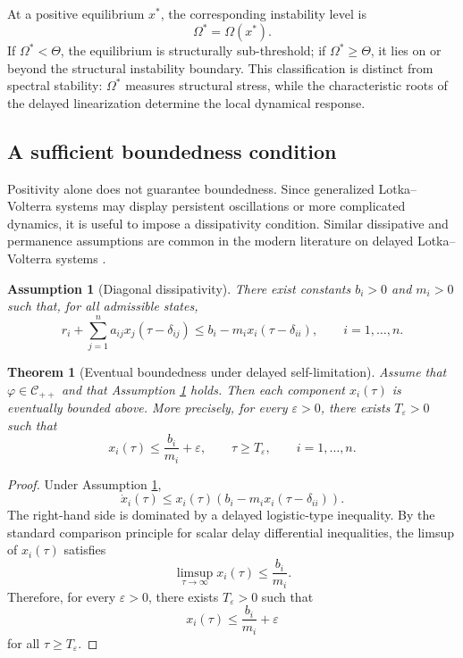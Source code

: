 \documentclass[11pt]{article}
\newtheorem{assumption}{Assumption}
\newtheorem{theorem}{Theorem}
\begin{document}
At a positive equilibrium \(x^\ast\), the corresponding instability level is
\[
\Omega^\ast=\Omega(x^\ast).
\]
If \(\Omega^\ast<\Theta\), the equilibrium is structurally sub-threshold; if \(\Omega^\ast\geq\Theta\), it lies on or beyond the structural instability boundary. This classification is distinct from spectral stability: \(\Omega^\ast\) measures structural stress, while the characteristic roots of the delayed linearization determine the local dynamical response.

\subsection{A sufficient boundedness condition}

Positivity alone does not guarantee boundedness. Since generalized
Lotka--Volterra systems may display persistent oscillations or more complicated
dynamics, it is useful to impose a dissipativity condition. Similar dissipative
and permanence assumptions are common in the modern literature on delayed
Lotka--Volterra systems \cite{JiangHalikMuhammadhaji2023NSpeciesDelays}.

\begin{assumption}[Diagonal dissipativity]
	\label{ass:dissipativity}
	There exist constants \(b_i>0\) and \(m_i>0\) such that, for all admissible
	states,
	\[
	r_i+\sum_{j=1}^{n}a_{ij}x_j(\tau-\delta_{ij})
	\leq
	b_i-m_i x_i(\tau-\delta_{ii}),
	\qquad i=1,\ldots,n.
	\]
\end{assumption}

\begin{theorem}[Eventual boundedness under delayed self-limitation]
	\label{thm:eventual-boundedness}
	Assume that \(\varphi\in\mathcal{C}_{++}\) and that Assumption
	\ref{ass:dissipativity} holds. Then each component \(x_i(\tau)\) is eventually
	bounded above. More precisely, for every \(\varepsilon>0\), there exists
	\(T_\varepsilon>0\) such that
	\[
	x_i(\tau)\leq \frac{b_i}{m_i}+\varepsilon,
	\qquad
	\tau\geq T_\varepsilon,
	\qquad i=1,\ldots,n.
	\]
\end{theorem}

\begin{proof}
	Under Assumption \ref{ass:dissipativity},
	\[
	\dot{x}_i(\tau)
	\leq
	x_i(\tau)
	\left(
	b_i-m_i x_i(\tau-\delta_{ii})
	\right).
	\]
	The right-hand side is dominated by a delayed logistic-type inequality. By the
	standard comparison principle for scalar delay differential inequalities, the
	limsup of \(x_i(\tau)\) satisfies
	\[
	\limsup_{\tau\to\infty}x_i(\tau)\leq \frac{b_i}{m_i}.
	\]
	Therefore, for every \(\varepsilon>0\), there exists \(T_\varepsilon>0\) such
	that
	\[
	x_i(\tau)\leq \frac{b_i}{m_i}+\varepsilon
	\]
	for all \(\tau\geq T_\varepsilon\).
\end{proof}
\end{document}
